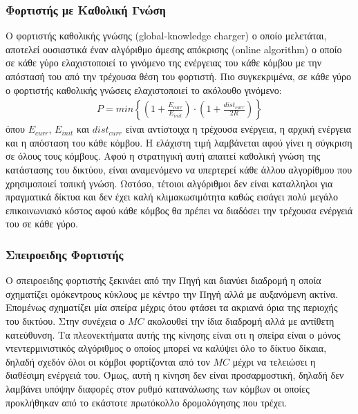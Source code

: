 \subsubsection{Φορτιστής με Καθολική Γνώση}
Ο φορτιστής καθολικής γνώσης (global-knowledge charger) ο οποίο μελετάται, αποτελεί ουσιαστικά έναν αλγόριθμο άμεσης απόκρισης (online algorithm) ο οποίο σε κάθε γύρο
ελαχιστοποιεί το γινόμενο της ενέργειας του κάθε κόμβου με την απόστασή του από την τρέχουσα θέση του φορτιστή. Πιο συγκεκριμένα, σε κάθε γύρο ο φορτιστής καθολικής
γνώσεις ελαχιστοποιεί το ακόλουθο γινόμενο:
\begin{align*}
P = min\left\{ \left(1 + \frac{E_{curr}}{E_{init}}\right) \cdot \left(1  + \frac{dist_{curr}}{2R}\right) \right\}
\end{align*}
όπου $E_{curr}$, $E_{init}$  και $dist_{curr}$ είναι αντίστοιχα η τρέχουσα ενέργεια, η αρχική ενέργεια και η απόσταση του κάθε κόμβου. Η ελάχιστη τιμή λαμβάνεται
αφού γίνει η σύγκριση σε όλους τους κόμβους. Αφού η στρατηγική αυτή απαιτεί καθολική γνώση της κατάστασης του δικτύου, είναι αναμενόμενο να υπερτερεί κάθε άλλου
αλγορίθμου που χρησιμοποιεί τοπική γνώση. Ωστόσο, τέτοιοι αλγόριθμοι δεν είναι καταλληλοι για πραγματικά δίκτυα και δεν έχει καλή κλιμακωσιμότητα καθώς εισάγει
πολύ μεγάλο επικοινωνιακό κόστος αφού κάθε κόμβος θα πρέπει να διαδόσει την τρέχουσα ενέργειά του σε κάθε γύρο.


\subsubsection{Σπειροειδης Φορτιστής}
Ο σπειροειδης φορτιστής ξεκινάει από την Πηγή και διανύει διαδρομή η οποία σχηματίζει ομόκεντρους κύκλους με κέντρο την Πηγή αλλά με αυξανόμενη ακτίνα. Επομένως
σχηματίζει μία σπείρα μέχρις ότου φτάσει τα ακριανά όρια της περιοχής του δικτύου. Στην συνέχεια  ο $MC$ ακολουθεί την ίδια διαδρομή αλλά με αντίθετη κατεύθυνση. Τα
πλεονεκτήματα αυτής της κίνησης είναι οτι η σπείρα είναι ο μόνος ντεντερμινιστικός αλγόριθμος ο οποίος μπορεί να καλύψει όλο το δίκτυο δίκαια, δηλαδή σχεδόν όλοι οι
κόμβοι φορτίζονται από τον $MC$ μέχρι να τελειώσει η διαθέσιμη ενέργειά του. Όμως, αυτή η κίνηση δεν είναι προσαρμοστική, δηλαδή δεν  λαμβάνει υπόψην διαφορές στον
ρυθμό κατανάλωσης των κόμβων οι οποίες προκλήθηκαν από το εκάστοτε πρωτόκολλο δρομολόγησης που τρέχει.

